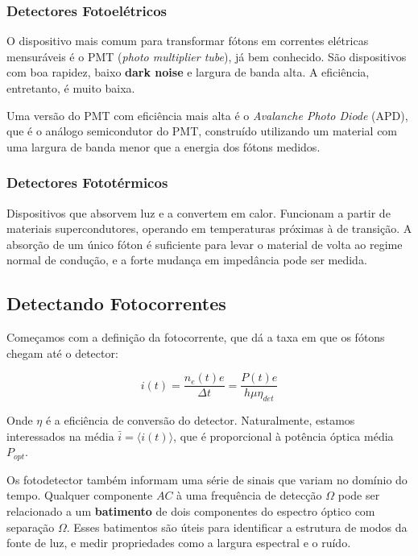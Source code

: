 \subsubsection{Detectores Fotoelétricos}

O dispositivo mais comum para transformar fótons em correntes elétricas mensuráveis é o PMT (\textit{photo multiplier tube}),  já bem conhecido. São dispositivos com boa rapidez, baixo \textbf{dark noise} e largura de banda alta. A eficiência, entretanto, é muito baixa.

Uma versão do PMT com eficiência mais alta é o \textit{Avalanche Photo Diode} (APD), que é o análogo semicondutor do PMT, construído utilizando um material com uma largura de banda menor que a energia dos fótons medidos.

\subsubsection{Detectores Fototérmicos}

Dispositivos que absorvem luz e a convertem em calor. Funcionam a partir de materiais supercondutores, operando em temperaturas próximas à de transição. A absorção de um único fóton é suficiente para levar o material de volta ao regime normal de condução, e a forte mudança em impedância pode ser medida.

\subsection{Detectando Fotocorrentes}

Começamos com a definição da fotocorrente, que dá a taxa em que os fótons chegam até o detector:

\begin{equation*}
    i(t)=\frac{n_e(t) e}{\Delta t}=\frac{P(t)e}{h\mu\eta_{det}}
\end{equation*}

Onde $\eta$ é a eficiência de conversão do detector. Naturalmente, estamos interessados na média $\bar{i}=\langle i(t) \rangle$, que é proporcional à potência óptica média $P_{opt}$.

Os fotodetector também informam uma série de sinais que variam no domínio do tempo. Qualquer componente $AC$ à uma frequência de detecção $\Omega$ pode ser relacionado a um \textbf{batimento} de dois componentes do espectro óptico com separação $\Omega$. Esses batimentos são úteis para identificar a estrutura de modos da fonte de luz, e medir propriedades como a largura espectral e o ruído.

